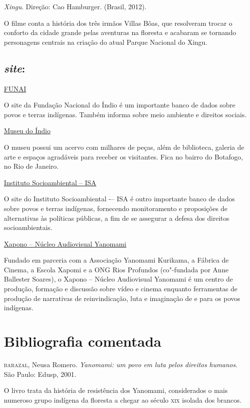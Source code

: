 \documentclass[12pt]{extarticle}
\begin{document}
{\textit{Xingu}. Direção: Cao Hamburger. (Brasil, 2012).

O filme conta a história dos três irmãos Villas Bôas, que resolveram
trocar o conforto da cidade grande pelas aventuras na floresta e
acabaram se tornando personagens centrais na criação do atual Parque
Nacional do Xingu.

\subsection{\emph{site}:}

\href{http://www.gov.br/funai}{FUNAI}

O site da Fundação Nacional do Índio é um importante banco de dados
sobre povos e terras indígenas. Também informa sobre meio ambiente e
direitos sociais.

\href{http://www.museudoindio.gov.br/}{Museu do Índio}

O museu possui um acervo com milhares de peças, além de biblioteca,
galeria de arte e espaços agradáveis para receber os visitantes. Fica no
bairro do Botafogo, no Rio de Janeiro.

\href{https://www.socioambiental.org/pt-br}{Instituto Socioambiental -- ISA}

O site do Instituto Socioambiental -– ISA é outro importante banco de dados 
sobre povos e terras indígenas, fornecendo monitoramento e proposições de 
alternativas às políticas públicas, a fim de se assegurar a defesa dos direitos
socioambientais. 

\href{https://vimeo.com/xapono?fbclid=IwAR2dao6qx16C1AwtQMf4HGTWCCsQ7ItIUtpq1R8ZiNB4EACiVNuJ-mp_gu8}{Xapono -- Núcleo Audiovisual Yanomami}

Fundado em parceria com a Associação Yanomami Kurikama, a Fábrica de 
Cinema, a Escola Xapomi e a ONG Rios Profundos (co"-fundada por Anne 
Ballester Soares), o Xapono -- Núcleo Audiovisual Yanomami é um centro 
de produção, formação e discussão sobre vídeo e cinema enquanto 
ferramentas de produção de narrativas de reinvindicação, luta e 
imaginação de e para os povos indígenas.

\section{Bibliografia comentada}

\textsc{barazal}, Neusa Romero. \textit{Yanomami: um povo em luta pelos direitos
humanos}. São Paulo: Edusp, 2001.

O livro trata da história de resistência dos Yanomami, considerados
o mais numeroso grupo indígena da floresta a chegar ao século \textsc{xix} isolada
dos brancos.

}
\end{document}
